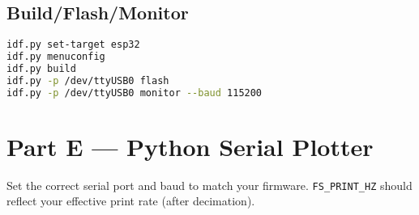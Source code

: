 \documentclass[11pt]{article}
\begin{document}
\subsection*{Build/Flash/Monitor}
\begin{lstlisting}[language=bash, caption={Typical ESP-IDF workflow}]
idf.py set-target esp32
idf.py menuconfig
idf.py build
idf.py -p /dev/ttyUSB0 flash
idf.py -p /dev/ttyUSB0 monitor --baud 115200
\end{lstlisting}

\section*{Part E — Python Serial Plotter}\label{sec:plotter}
Set the correct serial port and baud to match your firmware. \texttt{FS\_PRINT\_HZ} should reflect your effective print rate (after decimation).
\end{document}
